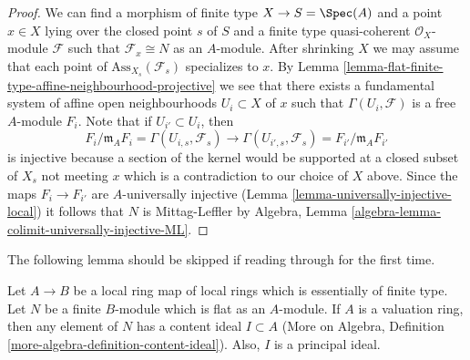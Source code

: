 \begin{proof}
We can find a morphism of finite type $X \to S = \Spec(A)$
and a point $x \in X$ lying over the closed point $s$ of $S$ and a finite
type quasi-coherent $\mathcal{O}_X$-module $\mathcal{F}$ such that
$\mathcal{F}_x \cong N$ as an $A$-module. After shrinking $X$
we may assume that each point of $\text{Ass}_{X_s}(\mathcal{F}_s)$ specializes
to $x$. By
Lemma \ref{lemma-flat-finite-type-affine-neighbourhood-projective}
we see that there exists a fundamental system of affine open neighbourhoods
$U_i \subset X$ of $x$ such that $\Gamma(U_i, \mathcal{F})$ is
a free $A$-module $F_i$. Note that if $U_{i'} \subset U_i$, then
$$
F_i/\mathfrak m_AF_i = \Gamma(U_{i, s}, \mathcal{F}_s)
\longrightarrow
\Gamma(U_{i', s}, \mathcal{F}_s) = F_{i'}/\mathfrak m_AF_{i'}
$$
is injective because a section of the kernel would be supported at
a closed subset of $X_s$ not meeting $x$ which is a contradiction
to our choice of $X$ above. Since the maps $F_i \to F_{i'}$ are
$A$-universally injective (Lemma \ref{lemma-universally-injective-local})
it follows that $N$ is
Mittag-Leffler by
Algebra, Lemma \ref{algebra-lemma-colimit-universally-injective-ML}.
\end{proof}

\noindent
The following lemma should be skipped if reading through for the first time.

\begin{lemma}
\label{lemma-flat-finite-type-local-valuation-ring-has-content}
Let $A \to B$ be a local ring map of local rings which is essentially of
finite type. Let $N$ be a finite $B$-module which is flat as an $A$-module.
If $A$ is a valuation ring, then any element of $N$ has a content ideal
$I \subset A$ (More on Algebra, Definition
\ref{more-algebra-definition-content-ideal}). Also, $I$ is a
principal ideal.
\end{lemma}

